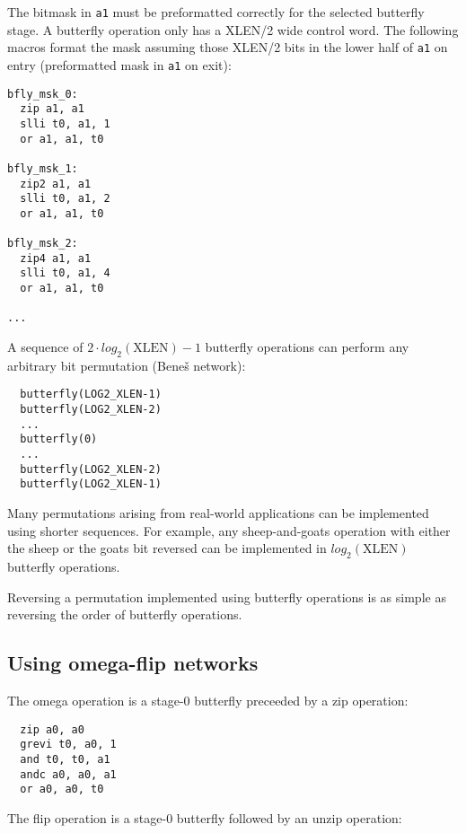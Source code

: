 The bitmask in {\tt a1} must be preformatted correctly for the selected butterfly
stage. A butterfly operation only has a XLEN/2 wide control word. The following
macros format the mask assuming those XLEN/2 bits in the lower half of {\tt a1}
on entry (preformatted mask in {\tt a1} on exit):

\begin{verbatim}
bfly_msk_0:
  zip a1, a1
  slli t0, a1, 1
  or a1, a1, t0

bfly_msk_1:
  zip2 a1, a1
  slli t0, a1, 2
  or a1, a1, t0

bfly_msk_2:
  zip4 a1, a1
  slli t0, a1, 4
  or a1, a1, t0

...
\end{verbatim}

A sequence of $2\cdot{}log_2(\textrm{XLEN})-1$ butterfly operations can perform any
arbitrary bit permutation (Bene{\v s} network):

\begin{verbatim}
  butterfly(LOG2_XLEN-1)
  butterfly(LOG2_XLEN-2)
  ...
  butterfly(0)
  ...
  butterfly(LOG2_XLEN-2)
  butterfly(LOG2_XLEN-1)
\end{verbatim}


Many permutations arising from real-world applications can be implemented
using shorter sequences. For example, any sheep-and-goats operation with either
the sheep or the goats bit reversed can be implemented in $log_2(\textrm{XLEN})$
butterfly operations.

Reversing a permutation implemented using butterfly operations is as simple as
reversing the order of butterfly operations.


\subsection{Using omega-flip networks}

The omega operation is a stage-0 butterfly preceeded by a zip operation:

\begin{verbatim}
  zip a0, a0
  grevi t0, a0, 1
  and t0, t0, a1
  andc a0, a0, a1
  or a0, a0, t0
\end{verbatim}

The flip operation is a stage-0 butterfly followed by an unzip operation:

